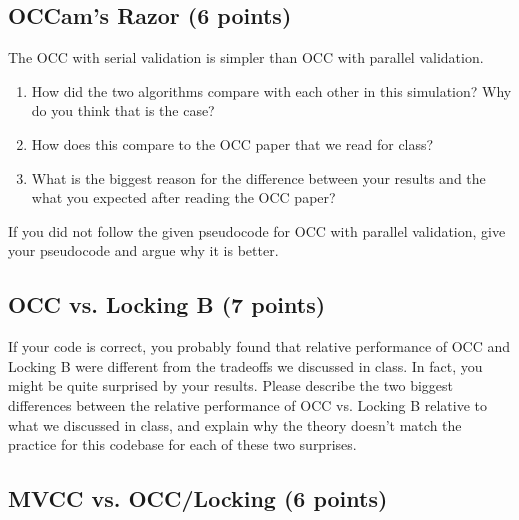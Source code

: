 \documentclass[11pt]{article}
\newcommand{\answer}[1]{}
\newcommand{\answer}[1]{{\color{black}\texttt{{a: - #1}}}}
\begin{document}
\subsection{OCCam's Razor (6 points)}

The OCC with serial validation is simpler than OCC with parallel validation.   

\begin{enumerate}
\item How did the two algorithms compare with each other in this simulation? Why do you think that is the case? \\
\answer{your answer here...}
\vspace{10mm}

\item How does this compare to the OCC paper that we read for class? \\
\answer{your answer here...}
\vspace{10mm}

\item What is the biggest reason for the difference between your results and the what you expected after reading the OCC paper? \\
\answer{your answer here...}
\vspace{10mm}
\end{enumerate}

If you did not follow the given pseudocode for OCC with parallel validation, give your pseudocode and argue why it is better.

\subsection{OCC vs. Locking B  (7 points)}

If your code is correct, you probably found that relative performance of OCC and Locking B were different from the tradeoffs we discussed in class. In fact, you might be quite surprised by your results. Please describe the two biggest differences between the relative performance of OCC vs. Locking B relative to what we discussed in class, and explain why the theory doesn't match the practice for this codebase for each of these two surprises. 

\subsection{MVCC vs. OCC/Locking (6 points)}
\end{document}
